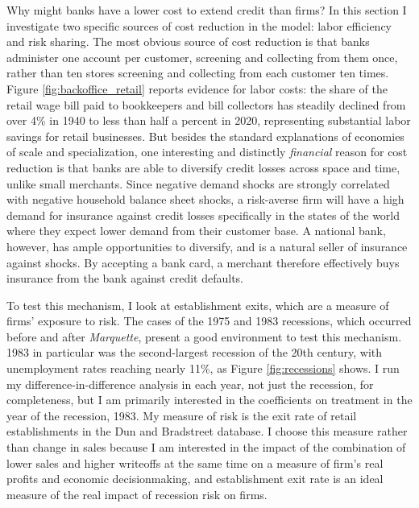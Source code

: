 \documentclass[12pt,english]{article}
\begin{document}
Why might banks have a lower cost to extend credit than firms? In this section I investigate two specific sources of cost reduction in the model: labor efficiency and risk sharing. The most obvious source of cost reduction is that banks administer one account per customer, screening and collecting from them once, rather than ten stores screening and collecting from each customer ten times. Figure \ref{fig:backoffice_retail} reports evidence for labor costs: the share of the retail wage bill paid to bookkeepers and bill collectors has steadily declined from over 4\% in 1940 to less than half a percent in 2020, representing substantial labor savings for retail businesses. But besides the standard explanations of economies of scale and specialization, one interesting and distinctly \emph{financial} reason for cost reduction is that banks are able to diversify credit losses across space and time, unlike small merchants. Since negative demand shocks are strongly correlated with negative household balance sheet shocks, a risk-averse firm will have a high demand for insurance against credit losses specifically in the states of the world where they expect lower demand from their customer base. A national bank, however, has ample opportunities to diversify, and is a natural seller of insurance against shocks. By accepting a bank card, a merchant therefore effectively buys insurance from the bank against credit defaults. 

To test this mechanism, I look at establishment exits, which are a measure of firms' exposure to risk. The cases of the 1975 and 1983 recessions, which occurred before and after \emph{Marquette}, present a good environment to test this mechanism. 1983 in particular was the second-largest recession of the 20th century, with unemployment rates reaching nearly 11\%, as Figure \ref{fig:recessions} shows. I run my difference-in-difference analysis in each year, not just the recession, for completeness, but I am primarily interested in the coefficients on treatment in the year of the recession, 1983. My measure of risk is the exit rate of retail establishments in the Dun and Bradstreet database. I choose this measure rather than change in sales because I am interested in the impact of the combination of lower sales and higher writeoffs at the same time on a measure of firm's real profits and economic decisionmaking, and establishment exit rate is an ideal measure of the real impact of recession risk on firms. 

\end{document}
